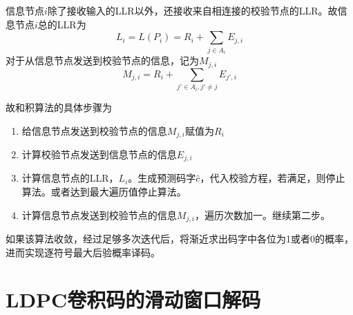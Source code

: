 信息节点$i$除了接收输入的LLR以外，还接收来自相连接的校验节点的LLR。故信息节点$i$总的LLR为
\begin{equation}
L_i = L(P_i) = R_i + \sum_{j\in A_i}E_{j,i}
\end{equation}
对于从信息节点发送到校验节点的信息，记为$M_{j,i}$
\begin{equation}
M_{j,i}= R_i + \sum_{j' \in A_i,j'\neq j}E_{j',i}
\end{equation}

故和积算法的具体步骤为
\begin{enumerate}
\item 给信息节点发送到校验节点的信息$M_{j,i}$赋值为$R_i$
\item 计算校验节点发送到信息节点的信息$E_{j,i}$
\item 计算信息节点的LLR，$L_i$。生成预测码字$\hat{c}$，代入校验方程，若满足，则停止算法。或者达到最大遍历值停止算法。
\item 计算信息节点发送到校验节点的信息$M_{j,i}$，遍历次数加一。继续第二步。
\end{enumerate}
如果该算法收敛，经过足够多次迭代后，将渐近求出码字中各位为1或者0的概率，进而实现逐符号最大后验概率译码。

\section{LDPC卷积码的滑动窗口解码}

